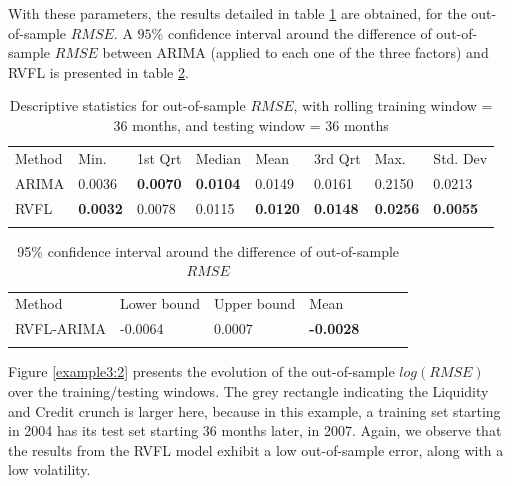 \medskip

With these parameters, the results detailed in table \ref{tab:freddatatables4} are obtained, for the out-of-sample $RMSE$. A $95\%$ confidence interval around the difference of out-of-sample $RMSE$ between ARIMA (applied to each one of the three factors) and RVFL is presented in table \ref{tab:confint3}. 

\begin{table}[!htb]
\begin{center}
\caption{Descriptive statistics for out-of-sample $RMSE$, with rolling training window = 36 months, and testing window = 36 months}
\label{tab:freddatatables4}       %
\begin{tabular}{llllllll}
\hline\noalign{\smallskip}
Method & Min. & 1st Qrt & Median & Mean & 3rd Qrt & Max. & Std. Dev\\
\noalign{\smallskip}\hline\noalign{\smallskip}
  ARIMA   & 0.0036  & \textbf{0.0070}  & \textbf{0.0104}  & 0.0149  & 0.0161  & 0.2150 & 0.0213\\
  RVFL    & \textbf{0.0032}  & 0.0078  & 0.0115  & \textbf{0.0120}  & \textbf{0.0148}  & \textbf{0.0256} & \textbf{0.0055}\\
\noalign{\smallskip}\hline
\end{tabular}
\end{center}
\end{table}

\begin{table}[!htb]
\begin{center}
\caption{95\% confidence interval around the difference of out-of-sample $RMSE$}
\label{tab:confint3}       %
\begin{tabular}{lllllll}
\hline\noalign{\smallskip}
Method & Lower bound & Upper bound  & Mean \\
\noalign{\smallskip}\hline\noalign{\smallskip}
  RVFL-ARIMA & -0.0064 & 0.0007 & \textbf{-0.0028} \\
\noalign{\smallskip}\hline
\end{tabular}
\end{center}
\end{table}

Figure \ref{example3:2} presents the evolution of the out-of-sample $log(RMSE)$ over the training/testing windows. The grey rectangle indicating the Liquidity and Credit crunch is larger here, because in this example, a training set starting in 2004 has its test set starting 36 months later, in 2007. Again, we observe that the results from the RVFL model exhibit a low out-of-sample error, along with a low volatility.

